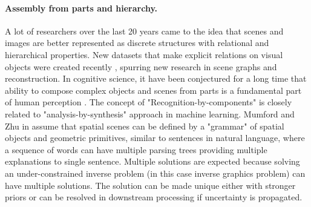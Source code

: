 \paragraph{Assembly from parts and hierarchy.}
A lot of researchers over the last 20 years came to the idea that scenes and images are better represented as discrete structures with relational and hierarchical properties.
New datasets that make explicit relations on visual objects were created recently \cite{krishna2017visual}, spurring new research in scene graphs \cite{DBLP:journals/corr/abs-1804-01622,Xu_2017_CVPR} and reconstruction. 
In cognitive science, it have been conjectured for a long time that ability to compose complex objects and scenes from parts is a fundamental part of human perception \cite{hoffman1984parts,biederman1987recognition}. The concept of "Recognition-by-components" is closely related to "analysis-by-synthesis" \cite{yuille2006vision,yildirim2015efficient} approach in machine learning. 
Mumford and Zhu in \cite{zhu2006stochastic} assume that spatial scenes can be defined by a "grammar" of spatial objects and geometric primitives, similar to sentences in natural language, where a sequence of words can have multiple parsing trees providing multiple explanations to single sentence. Multiple solutions are expected because solving an under-constrained inverse problem (in this case inverse graphics problem) can have multiple solutions. The solution can be made unique either with stronger priors or can be resolved in downstream processing if uncertainty is propagated.


